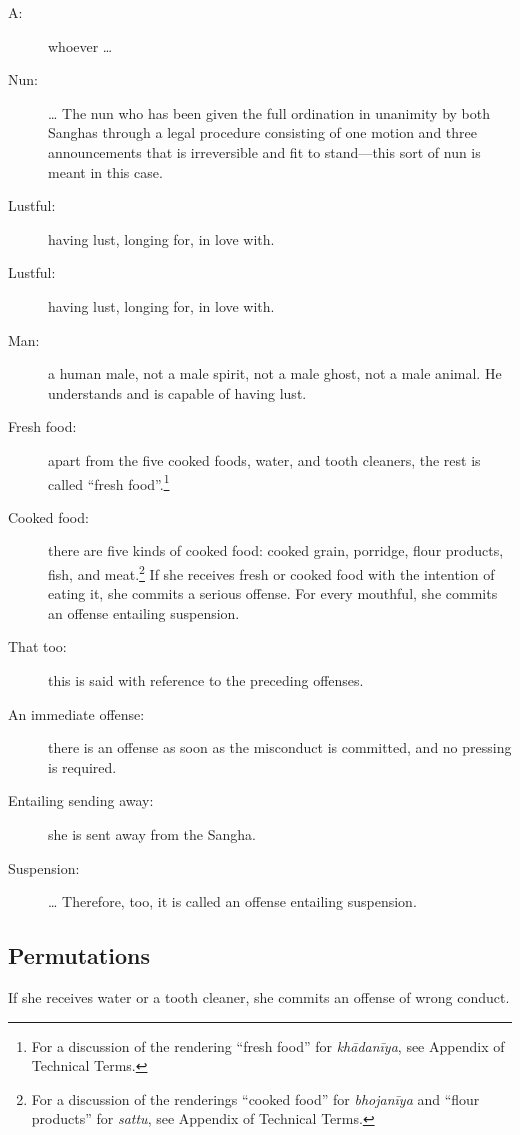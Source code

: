 \documentclass[12pt,openany]{book}%
\begin{document}
\begin{description}%
\item[A: ] whoever … %
\item[Nun: ] … The nun who has been given the full ordination in unanimity by both Sanghas through a legal procedure consisting of one motion and three announcements that is irreversible and fit to stand—this sort of nun is meant in this case. %
\item[Lustful: ] having lust, longing for, in love with. %
\item[Lustful: ] having lust, longing for, in love with. %
\item[Man: ] a human male, not a male spirit, not a male ghost, not a male animal. He understands and is capable of having lust. %
\item[Fresh food: ] apart from the five cooked foods, water, and tooth cleaners, the rest is called “fresh food”.\footnote{For a discussion of the rendering “fresh food” for \textit{\textsanskrit{khādanīya}}, see Appendix of Technical Terms. } %
\item[Cooked food: ] there are five kinds of cooked food: cooked grain, porridge, flour products, fish, and meat.\footnote{For a discussion of the renderings “cooked food” for \textit{\textsanskrit{bhojanīya}} and “flour products” for \textit{sattu}, see Appendix of Technical Terms. } If she receives fresh or cooked food with the intention of eating it, she commits a serious offense. For every mouthful, she commits an offense entailing suspension. %
\item[That too: ] this is said with reference to the preceding offenses. %
\item[An immediate offense: ] there is an offense as soon as the misconduct is committed, and no pressing is required. %
\item[Entailing sending away: ] she is sent away from the Sangha. %
\item[Suspension: ] … Therefore, too, it is called an offense entailing suspension. %
\end{description}

\subsection*{Permutations }

If she receives water or a tooth cleaner, she commits an offense of wrong conduct. 
\end{document}
